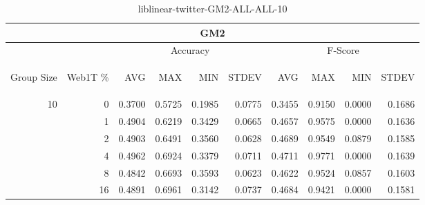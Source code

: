 \begin{center}
\begin{table}[htbp]
\begin{tabular}{ | r | r | r | r | r | r | r | r | r | r |}
\hline
\multicolumn{10}{|c|}{GM2}\\
\hline
 & & \multicolumn{4}{|c|}{Accuracy} & \multicolumn{4}{|c|}{F-Score}\\ \cline{3-10}
\begin{sideways}Group Size\end{sideways} & \begin{sideways}Web1T \%\end{sideways} & \begin{sideways}AVG\end{sideways} & \begin{sideways}MAX\end{sideways} & \begin{sideways}MIN\end{sideways} & \begin{sideways}STDEV\end{sideways} & \begin{sideways}AVG\end{sideways} & \begin{sideways}MAX\end{sideways} & \begin{sideways}MIN\end{sideways} & \begin{sideways}STDEV\end{sideways}\\
\hline
\multirow{6}{*}{10}
 & 0 & 0.3700 & 0.5725 & 0.1985 & 0.0775 & 0.3455 & 0.9150 & 0.0000 & 0.1686\\ \cline{2-10}
 & 1 & 0.4904 & 0.6219 & 0.3429 & 0.0665 & 0.4657 & 0.9575 & 0.0000 & 0.1636\\ \cline{2-10}
 & 2 & 0.4903 & 0.6491 & 0.3560 & 0.0628 & 0.4689 & 0.9549 & 0.0879 & 0.1585\\ \cline{2-10}
 & 4 & 0.4962 & 0.6924 & 0.3379 & 0.0711 & 0.4711 & 0.9771 & 0.0000 & 0.1639\\ \cline{2-10}
 & 8 & 0.4842 & 0.6693 & 0.3593 & 0.0623 & 0.4622 & 0.9524 & 0.0857 & 0.1603\\ \cline{2-10}
 & 16 & 0.4891 & 0.6961 & 0.3142 & 0.0737 & 0.4684 & 0.9421 & 0.0000 & 0.1581\\ \cline{2-10}
\hline
\end{tabular}
\caption{liblinear-twitter-GM2-ALL-ALL-10}
\end{table}
\end{center}

